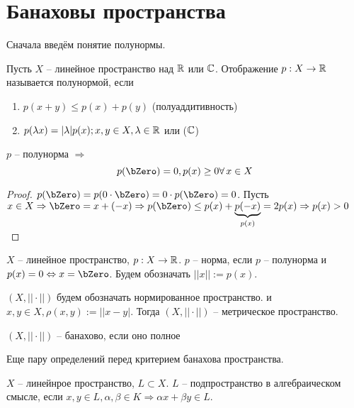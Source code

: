 \documentclass[document]{subfiles}
\begin{document}
\section{Банаховы пространства}

Сначала введём понятие полунормы.
\begin{definition}[полунорма]
    Пусть $X$ -- линейное пространство над $\mathbb{R}$ или $\mathbb{C}$. Отображение $p: X \rightarrow \mathbb{R}$ называется полунормой, если
    \begin{enumerate}
        \item $p(x + y) \leq p(x) + p(y)$ (полуаддитивность)
        \item $p(\lambda x) = |\lambda| p(x); x,y \in X, \lambda \in \mathbb{R}$ или ($\mathbb{C}$)
    \end{enumerate} 
\end{definition}

\begin{corollary}
    $p$ -- полунорма $\Rightarrow$
    \[ p(\bZero) = 0, p(x) \geq 0 \forall x \in X\]
\end{corollary}

\begin{proof}
    $p(\bZero) = p(0 \cdot \bZero) = 0 \cdot p(\bZero) = 0$.
    Пусть $x \in X \Rightarrow \bZero = x + (-x) \Rightarrow p(\bZero) \leq p(x) + \underbrace{p(-x)}_{p(x)} = 2p(x) \Rightarrow p(x) > 0$
\end{proof}

\begin{definition}[Норма]
    $X$ -- линейное пространство, $p : X \rightarrow \mathbb{R}$. $p$ -- норма, если $p$ -- полунорма и $p(x) = 0 \Leftrightarrow x = \bZero$.
    Будем обозначать $||x|| := p(x)$.
\end{definition}
$(X, || \cdot ||)$ будем обозначать нормированное пространство. и $x,y \in X, \rho(x,y) := ||x-y|$. Тогда $(X,||\cdot ||)$ -- метрическое пространство.

\begin{definition}
    $(X, || \cdot ||)$ -- банахово, если оно полное
\end{definition}
Еще пару определений перед критерием банахова пространства.

\begin{definition}
    $X$ -- линейнрое пространство, $L \subset X$. $L$ -- подпространство в алгебраическом смысле, если $x,y \in L, \alpha,\beta \in K \Rightarrow \alpha x + \beta y \in L$.
\end{definition}
\end{document}
